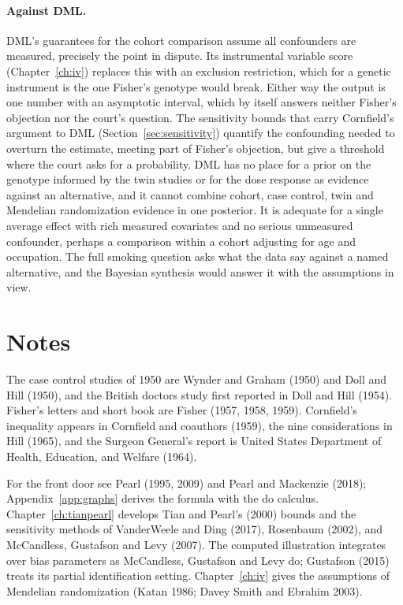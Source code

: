 \paragraph{Against DML.} DML's guarantees for the cohort comparison assume all confounders are measured, precisely the point in dispute. Its instrumental variable score (Chapter~\ref{ch:iv}) replaces this with an exclusion restriction, which for a genetic instrument is the one Fisher's genotype would break. Either way the output is one number with an asymptotic interval, which by itself answers neither Fisher's objection nor the court's question. The sensitivity bounds that carry Cornfield's argument to DML (Section~\ref{sec:sensitivity}) quantify the confounding needed to overturn the estimate, meeting part of Fisher's objection, but give a threshold where the court asks for a probability. DML has no place for a prior on the genotype informed by the twin studies or for the dose response as evidence against an alternative, and it cannot combine cohort, case control, twin and Mendelian randomization evidence in one posterior. It is adequate for a single average effect with rich measured covariates and no serious unmeasured confounder, perhaps a comparison within a cohort adjusting for age and occupation. The full smoking question asks what the data say against a named alternative, and the Bayesian synthesis would answer it with the assumptions in view.

\section*{Notes}

The case control studies of 1950 are Wynder and Graham (1950) and Doll and Hill (1950), and the British doctors study first reported in Doll and Hill (1954). Fisher's letters and short book are Fisher (1957, 1958, 1959). Cornfield's inequality appears in Cornfield and coauthors (1959), the nine considerations in Hill (1965), and the Surgeon General's report is United States Department of Health, Education, and Welfare (1964).

For the front door see Pearl (1995, 2009) and Pearl and Mackenzie (2018); Appendix~\ref{app:graphs} derives the formula with the do calculus. Chapter~\ref{ch:tianpearl} develops Tian and Pearl's (2000) bounds and the sensitivity methods of VanderWeele and Ding (2017), Rosenbaum (2002), and McCandless, Gustafson and Levy (2007). The computed illustration integrates over bias parameters as McCandless, Gustafson and Levy do; Gustafson (2015) treats its partial identification setting. Chapter~\ref{ch:iv} gives the assumptions of Mendelian randomization (Katan 1986; Davey Smith and Ebrahim 2003).

